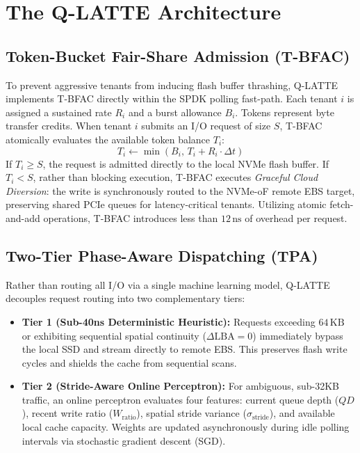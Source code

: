 \documentclass[lettersize,journal]{IEEEtran}
\begin{document}
\section{The Q-LATTE Architecture}

\subsection{Token-Bucket Fair-Share Admission (T-BFAC)}
To prevent aggressive tenants from inducing flash buffer thrashing, Q-LATTE implements T-BFAC directly within the SPDK polling fast-path. Each tenant $i$ is assigned a sustained rate $R_i$ and a burst allowance $B_i$. Tokens represent byte transfer credits.
When tenant $i$ submits an I/O request of size $S$, T-BFAC atomically evaluates the available token balance $T_i$:
\begin{equation}
T_i \leftarrow \min\left(B_i, \, T_i + R_i \cdot \Delta t\right)
\end{equation}
If $T_i \ge S$, the request is admitted directly to the local NVMe flash buffer. If $T_i < S$, rather than blocking execution, T-BFAC executes \textit{Graceful Cloud Diversion}: the write is synchronously routed to the NVMe-oF remote EBS target, preserving shared PCIe queues for latency-critical tenants. Utilizing atomic fetch-and-add operations, T-BFAC introduces less than $12\,\text{ns}$ of overhead per request.

\subsection{Two-Tier Phase-Aware Dispatching (TPA)}
Rather than routing all I/O via a single machine learning model, Q-LATTE decouples request routing into two complementary tiers:
\begin{itemize}
    \item \textbf{Tier 1 (Sub-40ns Deterministic Heuristic):} Requests exceeding $64\,\text{KB}$ or exhibiting sequential spatial continuity ($\Delta \text{LBA} = 0$) immediately bypass the local SSD and stream directly to remote EBS. This preserves flash write cycles and shields the cache from sequential scans.
    \item \textbf{Tier 2 (Stride-Aware Online Perceptron):} For ambiguous, sub-32KB traffic, an online perceptron evaluates four features: current queue depth ($QD$), recent write ratio ($W_{\text{ratio}}$), spatial stride variance ($\sigma_{\text{stride}}$), and available local cache capacity. Weights are updated asynchronously during idle polling intervals via stochastic gradient descent (SGD).
\end{itemize}
\end{document}
